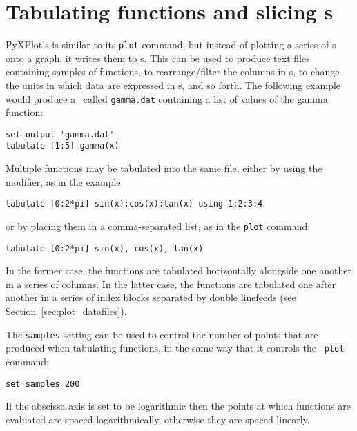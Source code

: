 \section{Tabulating functions and slicing \datafile s}
\label{sec:tabulate}

PyXPlot's  is similar to its {\tt plot} command, but instead
of plotting a series of \datapoint s onto a graph, it writes them to \datafile
s. This can be used to produce text files containing samples of functions, to
rearrange/filter the columns in \datafile s, to change the units in which data
are expressed in \datafile s, and so forth.  The following example would produce
a \datafile\ called {\tt gamma.dat} containing a list of values of the gamma
function:

\begin{verbatim}
set output 'gamma.dat'
tabulate [1:5] gamma(x)
\end{verbatim}

\noindent Multiple functions may be tabulated into the same file, either by
using the  modifier, as in the example

\begin{verbatim}
tabulate [0:2*pi] sin(x):cos(x):tan(x) using 1:2:3:4
\end{verbatim}

\noindent or by placing them in a comma-separated list, as in the {\tt plot}
command:

\begin{verbatim}
tabulate [0:2*pi] sin(x), cos(x), tan(x)
\end{verbatim}

In the former case, the functions are tabulated horizontally alongside one
another in a series of columns. In the latter case, the functions are tabulated
one after another in a series of index blocks separated by double linefeeds
(see Section~\ref{sec:plot_datafiles}).

The {\tt samples} setting can be used to control the number of points that are
produced when tabulating functions, in the same way that it controls the {\tt
plot} command:

\begin{verbatim}
set samples 200
\end{verbatim}

\noindent If the abscissa axis is set to be logarithmic then the points at which
functions are evaluated are spaced logarithmically, otherwise they are spaced
linearly.

